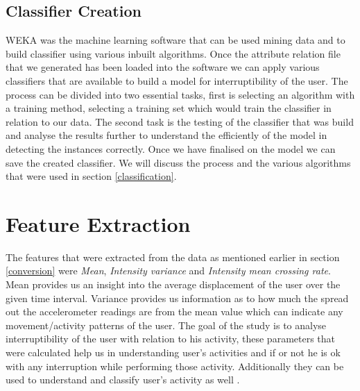 \documentclass[10pt,a4paper]{article}
\begin{document}
\subsection{Classifier Creation}
WEKA was the machine learning software that can be used mining data and to build classifier using various inbuilt algorithms. Once the attribute relation file that we generated has been loaded into the software we can apply various classifiers that are available to build a model for interruptibility of the user. The process can be divided into two essential tasks, first is selecting an algorithm with a training method, selecting a training set which would train the classifier in relation to our data. The second task is the testing of the classifier that was build and analyse the results further to understand the efficiently of the model in detecting the instances correctly. Once we have finalised on the model we can save the created classifier. We will discuss the process and the various algorithms that were used in section \ref{classification}.

\section{Feature Extraction}
The features that were extracted from the data as mentioned earlier in section \ref{conversion} were \textit{Mean}, \textit{Intensity variance} and \textit{Intensity mean crossing rate}. Mean provides us an insight into the average displacement of the user over the given time interval. Variance provides us information as to how much the spread out the accelerometer readings are from the mean value which can indicate any movement/activity patterns of the user. The goal of the study is to analyse interruptibility of the user with relation to his activity, these parameters that were calculated help us in understanding user's activities and if or not he is ok with any interruption while performing those activity. Additionally they can be used to understand and classify user's activity as well \cite{ravi2005activity}.
\end{document}
